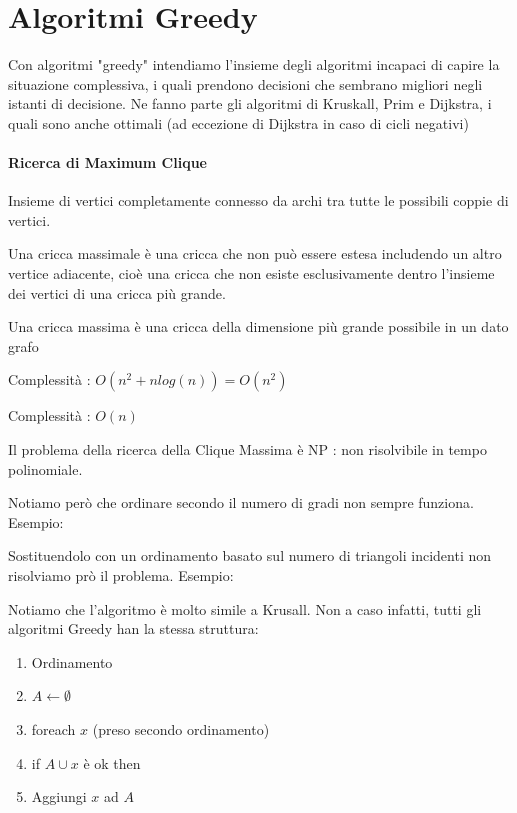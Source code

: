 \documentclass[11pt,a4paper,twoside,openright]{book}
\let\oldparagraph\paragraph
\renewcommand{\paragraph}[1]{\oldparagraph{#1}\mbox{}}
\begin{document}
{{\section{Algoritmi Greedy}
Con algoritmi "greedy" intendiamo l'insieme degli algoritmi incapaci di capire la situazione complessiva, i quali prendono decisioni che sembrano migliori negli istanti di decisione. Ne fanno parte gli algoritmi di Kruskall, Prim e Dijkstra, i quali sono anche ottimali (ad eccezione di Dijkstra in caso di cicli negativi)

\paragraph{Ricerca di Maximum Clique}

Insieme di vertici completamente connesso da archi tra tutte le possibili coppie di vertici.

Una cricca massimale è una cricca che non può essere estesa includendo un altro vertice adiacente, cioè una cricca che non esiste esclusivamente dentro l'insieme dei vertici di una cricca più grande.

Una cricca massima è una cricca della dimensione più grande possibile in un dato grafo




Complessità : $O(n^2 + nlog(n)) = O(n^2)$



Complessità : $O(n)$

Il problema della ricerca della Clique Massima è NP : non risolvibile in tempo polinomiale.

Notiamo però che ordinare secondo il numero di gradi non sempre funziona. Esempio:



Sostituendolo con un ordinamento basato sul numero di triangoli incidenti non risolviamo prò il problema. Esempio:



Notiamo che l'algoritmo è molto simile a Krusall. Non a caso infatti, tutti gli algoritmi Greedy han la stessa struttura:

\begin{enumerate}
\item Ordinamento
\item $ A \leftarrow \emptyset$
\item foreach $x$ (preso secondo ordinamento)
\item \hspace{\parindent} if $A \cup x$ è ok then
\item \hspace{\parindent} \hspace{\parindent} Aggiungi $x$ ad $A$
\end{enumerate}

}}
\end{document}
